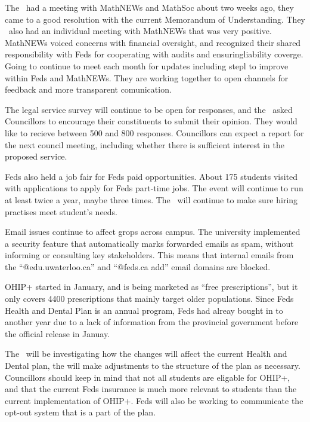 \begin{information}

    The \vpof\ had a meeting with MathNEWs and MathSoc about two weeks ago,
    they came to a good resolution with the current Memorandum of 
    Understanding. They \vpof\ also had an individual meeting with MathNEWs 
    that was very positive. MathNEWs voiced concerns with financial
    oversight, and recognized their shared responsibility with Feds for 
    cooperating with audits and ensuringliability coverge. Going to continue to
    meet each month for updates including stepl to improve within Feds and 
    MathNEWs. They are working together to open channels for feedback and more 
    transparent comunication.

    The legal service survey will continue to be open for responses, and the
    \vpof\ asked Councillors to encourage their constituents to submit their
    opinion. They would like to recieve between 500 and 800 responses.
    Councillors can expect a report for the next council meeting, including
    whether there is sufficient interest in the proposed service. 

    Feds also held a job fair for Feds paid opportunities. About 175 students 
    visited with applications to apply for Feds part-time jobs. The event
    will continue to run at least twice a year, maybe three times. The \vpof\ 
    will continue to make sure hiring practises meet student's needs. 

    Email issues continue to affect grops across campus. The university 
    implemented a security feature that automatically marks forwarded emails 
    as spam, without informing or consulting key stakeholders. This means that
    internal emails from the ``@edu.uwaterloo.ca'' and ``@feds.ca add'' email
    domains are blocked.

    OHIP+ started in January, and is being marketed as ``free prescriptions'',
    but it only covers 4400 prescriptions that mainly target older populations.
    Since Feds Health and Dental Plan is an annual program, Feds had alreay
    bought in to another year due to a lack of information from the provincial
    government before the official release in Januay.

    The \vpof\ will be investigating how the changes will affect the current
    Health and Dental plan, the will make adjustments to the structure of the 
    plan as necessary. Councillors should keep in mind that not all students
    are eligable for OHIP+, and that the current Feds insurance is much more
    relevant to students than the current implementation of OHIP+. Feds will
    also be working to communicate the opt-out system that is a part of the
    plan. 


\end{information}
